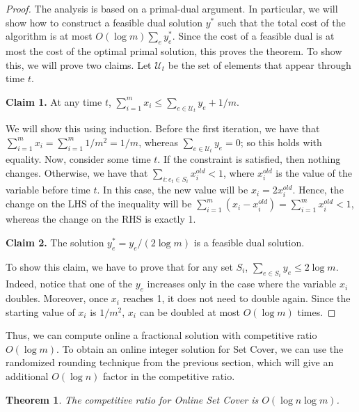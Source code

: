 \documentclass[10pt,a4paper]{article}
\newtheorem{thm}{Theorem}[section]
\newcommand{\mU}{\mathcal{U}}
\begin{document}
\begin{proof}
The analysis is based on a primal-dual argument. In particular, we will show how to construct a feasible dual solution $y^*$ such that the total cost of the algorithm is at most $O(\log m) \sum_{e} y_e^*$. Since the cost of a feasible dual is at most the cost of the optimal primal solution, this proves the theorem.
To show this, we will prove two claims. Let $\mU_t$ be the set of elements that appear through time $t$.

\noindent \textbf{Claim 1.} At any time $t$, $\sum_{i=1}^m x_i \leq \sum_{e \in \mU_t} y_e + 1/m$.

We will show this using induction. Before the first iteration, we have that $\sum_{i=1}^m x_i = \sum_{i=1}^m 1/m^2 = 1/m$, whereas $\sum_{e \in \mU_t} y_e= 0$; so this holds with equality. Now, consider some time $t$. If the constraint is satisfied, then nothing changes. Otherwise, we have that $\sum_{i: e_t \in S_i} x_i^{old} < 1$, where $x_i^{old}$ is the value of the variable before time $t$. In this case, the new value will be $x_i  = 2 x_i^{old}$. Hence, the change on the LHS of the inequality will be $\sum_{i=1}^m (x_i - x_i^{old}) = \sum_{i=1}^m x_i^{old} < 1$, whereas the change on the RHS is exactly 1.

\noindent \textbf{Claim 2.} The solution $y_e^* = y_e / (2 \log m)$ is a feasible dual solution.

To show this claim, we have to prove that for any set $S_i$, $\sum_{e \in S_i} y_e \leq 2 \log m$. Indeed, notice that one of the $y_e$ increases only in the case where the variable $x_i$ doubles. Moreover, once $x_i$ reaches 1, it does not need to double again. Since the starting value of $x_i$ is $1/m^2$, $x_i$ can be doubled at most $O(\log m)$ times.
\end{proof}

Thus, we can compute online a fractional solution with competitive ratio $O(\log m)$. To obtain an online integer solution for Set Cover, we can use the randomized rounding technique from the previous section, which will give an additional $O(\log n)$ factor in the competitive ratio. 

\begin{thm}
The competitive ratio for Online Set Cover is $O(\log n \log m)$.
\end{thm}
\end{document}
